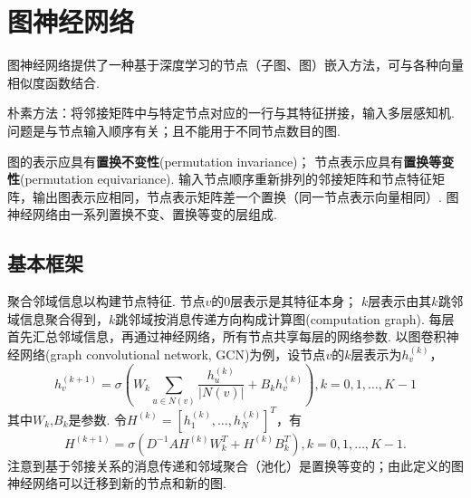 \section{图神经网络}

\par 图神经网络提供了一种基于深度学习的节点（子图、图）嵌入方法，可与各种向量相似度函数结合. 

\par 朴素方法：将邻接矩阵中与特定节点对应的一行与其特征拼接，输入多层感知机. 问题是与节点输入顺序有关；且不能用于不同节点数目的图. 

\par 图的表示应具有\textbf{置换不变性}(permutation invariance)； 节点表示应具有\textbf{置换等变性}(permutation equivariance). 输入节点顺序重新排列的邻接矩阵和节点特征矩阵，输出图表示应相同，节点表示矩阵差一个置换（同一节点表示向量相同）. 图神经网络由一系列置换不变、置换等变的层组成. 

\subsection{基本框架}
\par 聚合邻域信息以构建节点特征. 节点$v$的0层表示是其特征本身； $k$层表示由其$k$跳邻域信息聚合得到，$k$跳邻域按消息传递方向构成计算图(computation graph). 每层首先汇总邻域信息，再通过神经网络，所有节点共享每层的网络参数. 以图卷积神经网络(graph convolutional network, GCN)为例，设节点$v$的$k$层表示为$h_v^{(k)}$，
\begin{equation}
    h_v^{(k+1)}=\sigma(W_k\sum_{u\in N(v)}\frac{h_u^{(k)}}{\vert N(v)\vert}+B_k h_v^{(k)}), k=0,1,\dots,K-1
\end{equation}
其中$W_k$,$B_k$是参数. 令$H^{(k)}=[h_1^{(k)},\dots, h_N^{(k)}]^T$，有
\begin{equation}
H^{(k+1)}=\sigma(D^{-1}AH^{(k)}W_k^T+H^{(k)}B_k^T), k=0,1,\dots,K-1.
\end{equation}
注意到基于邻接关系的消息传递和邻域聚合（池化）是置换等变的；由此定义的图神经网络可以迁移到新的节点和新的图. 

